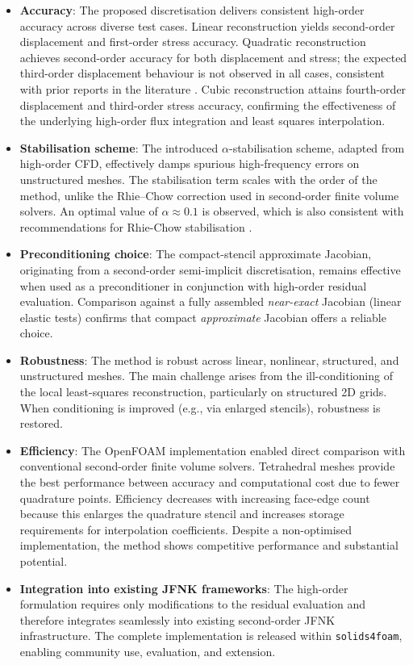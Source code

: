 \documentclass[sn-mathphys,Numbered]{sn-jnl}%
\begin{document}
\begin{itemize}
%
\item \textbf{Accuracy}: The proposed discretisation delivers consistent high-order accuracy across diverse test cases. Linear reconstruction yields second-order displacement and first-order stress accuracy. Quadratic reconstruction achieves second-order accuracy for both displacement and stress; the expected third-order displacement behaviour is not observed in all cases, consistent with prior reports in the literature \cite{Nishikawa2025a}. Cubic reconstruction attains fourth-order displacement and third-order stress accuracy, confirming the effectiveness of the underlying high-order flux integration and least squares interpolation.
%
\item \textbf{Stabilisation scheme}: The introduced $\alpha$-stabilisation scheme, adapted from high-order CFD, effectively damps spurious high-frequency errors on unstructured meshes. The stabilisation term scales with the order of the method, unlike the Rhie–Chow correction used in second-order finite volume solvers. An optimal value of $\alpha \approx 0.1$ is observed, which is also consistent with recommendations for Rhie-Chow stabilisation \cite{Cardiff2025}.
%
\item \textbf{Preconditioning choice}: The compact-stencil approximate Jacobian, originating from a second-order semi-implicit discretisation, remains effective when used as a preconditioner in conjunction with high-order residual evaluation. Comparison against a fully assembled \emph{near-exact} Jacobian (linear elastic tests) confirms that compact \emph{approximate} Jacobian offers a reliable choice.
%
\item \textbf{Robustness}:
The method is robust across linear, nonlinear, structured, and unstructured meshes. The main challenge arises from the ill-conditioning of the local least-squares reconstruction, particularly on structured 2D grids. When conditioning is improved (e.g., via enlarged stencils), robustness is restored.
%
\item \textbf{Efficiency}: The OpenFOAM implementation enabled direct comparison with conventional second-order finite volume solvers. Tetrahedral meshes provide the best performance between accuracy and computational cost due to fewer quadrature points. Efficiency decreases with increasing face-edge count because this enlarges the quadrature stencil and increases storage requirements for interpolation coefficients. Despite a non-optimised implementation, the method shows competitive performance and substantial potential.
%
\item \textbf{Integration into existing JFNK frameworks}: The high-order formulation requires only modifications to the residual evaluation and therefore integrates seamlessly into existing second-order JFNK infrastructure. The complete implementation is released within \texttt{solids4foam}, enabling community use, evaluation, and extension.
%
\end{itemize}
\end{document}
